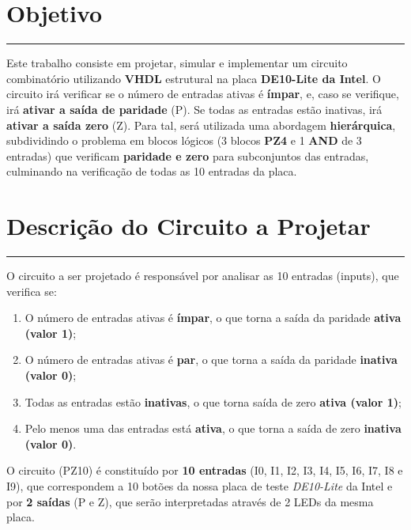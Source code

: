 \documentclass[12pt]{article}
\begin{document}
\pagestyle{firstpage}
\setcounter{page}{2}

\section{Objetivo} \label{obj}
\hrule
\vspace{0.5cm}
\justifying


Este trabalho consiste em projetar, simular e implementar um circuito combinatório utilizando \textbf{VHDL} estrutural na placa \textbf{DE10-Lite da Intel}. O circuito irá verificar se o número de entradas ativas é \textbf{ímpar}, e, caso se verifique, irá \textbf{ativar a saída de paridade} (P). Se todas as entradas estão inativas, irá \textbf{ativar a saída zero }(Z). Para tal, será utilizada uma abordagem \textbf{hierárquica}, subdividindo o problema em blocos lógicos (3 blocos \textbf{PZ4} e 1 \textbf{AND} de 3 entradas) que verificam \textbf{paridade e zero} para subconjuntos das entradas, culminando na verificação de todas as 10 entradas da placa.


\section{Descrição do Circuito a Projetar}
\hrule

\vspace{0.5cm}
O circuito a ser projetado é responsável por analisar as 10 entradas (inputs), que verifica se:

\begin{enumerate}[label={-}]
    \item O número de entradas ativas é \textbf{ímpar}, o que torna a saída da paridade \textbf{ativa (valor 1)};
    \item O número de entradas ativas é \textbf{par}, o que torna a saída da paridade \textbf{inativa (valor 0)};
    \item Todas as entradas estão \textbf{inativas}, o que torna saída de zero \textbf{ativa (valor 1)};
    \item Pelo menos uma das entradas está \textbf{ativa}, o que torna a saída de zero \textbf{inativa (valor 0)}.
\end{enumerate}

\vspace{2mm} O circuito (PZ10) é constituído por \textbf{10 entradas} (I0, I1, I2, I3, I4, I5, I6, I7, I8 e I9), que correspondem a 10 botões da nossa placa de teste \textit{DE10-Lite} da Intel e por \textbf{2 saídas} (P e Z), que serão interpretadas através de 2 LEDs da mesma placa.
\end{document}
